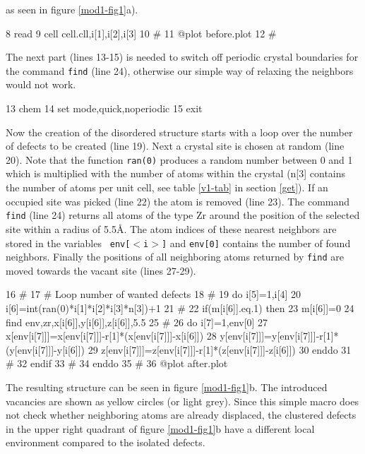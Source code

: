 as seen in figure \ref{mod1-fig1}a).
%
\begin{MacVerbatim}
     8  read
     9  cell cell.cll,i[1],i[2],i[3]
    10  #
    11  @plot before.plot
    12  #
\end{MacVerbatim}
%
The next part (lines 13-15) is needed to switch off periodic crystal
boundaries for the command {\tt find} (line 24), otherwise our
simple way of relaxing the neighbors would not work.
%
\begin{MacVerbatim}
    13  chem
    14  set mode,quick,noperiodic
    15  exit
\end{MacVerbatim}
%
Now the creation of the disordered structure starts with a loop over
the number of defects to be created (line 19).  Next a crystal site
is chosen at random (line 20).  Note that the function {\tt ran(0)}
produces a random number between 0 and 1 which is multiplied with
the number of atoms within the crystal (n[3] contains the number of
atoms per unit cell, see table \ref{v1-tab} in section \ref{get}).  
If an occupied site
was picked (line 22) the atom is removed (line 23).  The command
{\tt find} (line 24) returns all atoms of the type Zr around the
position of the selected site within a radius of 5.5\AA.  The atom
indices of these nearest neighbors are stored in the variables {\tt
env[$<$i$>$]} and {\tt env[0]} contains the number of found
neighbors. Finally the positions of all neighboring atoms returned
by {\tt find} are moved towards the vacant site (lines 27-29).
%
\begin{MacVerbatim}
    16  #
    17  # Loop number of wanted defects
    18  #
    19  do i[5]=1,i[4]
    20    i[6]=int(ran(0)*i[1]*i[2]*i[3]*n[3])+1
    21  #
    22    if(m[i[6]].eq.1) then
    23      m[i[6]]=0
    24      find env,zr,x[i[6]],y[i[6]],z[i[6]],5.5
    25  #
    26      do i[7]=1,env[0]
    27        x[env[i[7]]]=x[env[i[7]]]-r[1]*(x[env[i[7]]]-x[i[6]])
    28        y[env[i[7]]]=y[env[i[7]]]-r[1]*(y[env[i[7]]]-y[i[6]])
    29        z[env[i[7]]]=z[env[i[7]]]-r[1]*(z[env[i[7]]]-z[i[6]])
    30      enddo
    31  #
    32    endif
    33  #
    34  enddo
    35  #
    36  @plot after.plot
\end{MacVerbatim}
%
The resulting structure can be seen in figure \ref{mod1-fig1}b.
The introduced vacancies are shown as yellow circles (or light
grey). Since this simple macro does not check whether neighboring
atoms are already displaced, the clustered defects in the upper
right quadrant of figure \ref{mod1-fig1}b have a different local
environment compared to the isolated defects.

